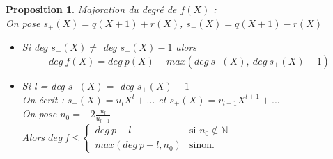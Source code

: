 \documentclass[17 pt,french]{scrartcl}
\newtheorem{prop}{Proposition}
\begin{document}
	\newpage
	\begin{prop}
	Majoration du degré de $f(X)$ : \\
	On pose $s_{+}(X) = q(X+1)+r(X)$, $s_{-}(X) = q(X+1)-r(X)$
	\begin{itemize}
	\item Si deg $s_{-}(X) \neq $ deg $s_{+}(X)-1$ alors 
		$$deg \ f(X) = deg \ p(X) - max(deg \ s_{-}(X),\ deg \ s_{+}(X) - 1)$$
    \item Si l = deg $s_{-}(X) = $ deg $s_{+}(X)-1$ \\
    	On écrit : $s_{-}(X) = u_lX^l + ... $ et $s_{+}(X) = v_{l+1}X^{l+1} + ... $ \\
    	On pose $n_0 = -2\frac{u_l}{u_{l+1}}$\\
    	Alors $deg \ f \leq  \left\{  \begin{array}{ll}
        deg \ p -l & \mbox{si } n_0 \notin \mathbb{N} \\
        max(deg \ p-l, n_0) & \mbox{sinon.}
    \end{array}
    \right.$
	\end{itemize}
	\end{prop}
	
\end{document}
